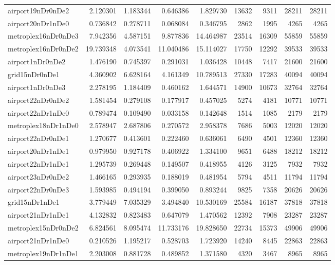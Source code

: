 \begin{longtable}{|l|r|r|r|r|r|r|r|r|}
airport19nDr0nDe2 & 2.120301 & 1.183344 & 0.646386 & 1.829730 & 13632 & 9311 & 28211 & 28211 \\
airport20nDr1nDe0 & 0.736842 & 0.278711 & 0.068084 & 0.346795 & 2862 & 1995 & 4265 & 4265 \\
metroplex16nDr0nDe3 & 7.942356 & 4.587151 & 9.877836 & 14.464987 & 23514 & 16309 & 55859 & 55859 \\
metroplex16nDr0nDe2 & 19.739348 & 4.073541 & 11.040486 & 15.114027 & 17750 & 12292 & 39533 & 39533 \\
airport1nDr0nDe2 & 1.476190 & 0.745397 & 0.291031 & 1.036428 & 10448 & 7417 & 21600 & 21600 \\
grid15nDr0nDe1 & 4.360902 & 6.628164 & 4.161349 & 10.789513 & 27330 & 17283 & 40094 & 40094 \\
airport1nDr0nDe3 & 2.278195 & 1.184409 & 0.460162 & 1.644571 & 14900 & 10673 & 32764 & 32764 \\
airport22nDr0nDe2 & 1.581454 & 0.279108 & 0.177917 & 0.457025 & 5274 & 4181 & 10771 & 10771 \\
airport22nDr1nDe0 & 0.789474 & 0.109490 & 0.033158 & 0.142648 & 1514 & 1085 & 2179 & 2179 \\
metroplex18nDr1nDe0 & 2.578947 & 2.687806 & 0.270572 & 2.958378 & 7686 & 5003 & 12020 & 12020 \\
airport22nDr0nDe1 & 1.270677 & 0.413601 & 0.222460 & 0.636061 & 6490 & 4501 & 12360 & 12360 \\
airport20nDr1nDe1 & 0.979950 & 0.927178 & 0.406922 & 1.334100 & 9651 & 6488 & 18212 & 18212 \\
airport22nDr1nDe1 & 1.295739 & 0.269448 & 0.149507 & 0.418955 & 4126 & 3125 & 7932 & 7932 \\
airport23nDr0nDe2 & 1.466165 & 0.293935 & 0.188019 & 0.481954 & 5794 & 4511 & 11794 & 11794 \\
airport22nDr0nDe3 & 1.593985 & 0.494194 & 0.399050 & 0.893244 & 9825 & 7358 & 20626 & 20626 \\
grid15nDr1nDe1 & 3.779449 & 7.035329 & 3.494840 & 10.530169 & 25584 & 16187 & 37818 & 37818 \\
airport21nDr1nDe1 & 4.132832 & 0.823483 & 0.647079 & 1.470562 & 12392 & 7908 & 23287 & 23287 \\
metroplex15nDr0nDe2 & 6.824561 & 8.095474 & 11.733176 & 19.828650 & 22734 & 15373 & 49906 & 49906 \\
airport21nDr1nDe0 & 0.210526 & 1.195217 & 0.528703 & 1.723920 & 14240 & 8445 & 22863 & 22863 \\
metroplex19nDr1nDe1 & 2.203008 & 0.881728 & 0.489852 & 1.371580 & 4320 & 3467 & 8965 & 8965 \\

\end{longtable}
